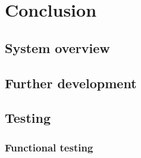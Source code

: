 \chapter{Conclusion}

\section{System overview}

\section{Further development}

\section{Testing}

\subsection{Functional testing}

